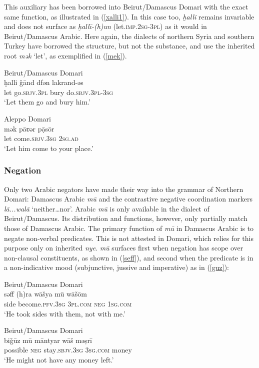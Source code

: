 \documentclass[output=paper]{langsci/langscibook}
\begin{document}
This auxiliary has been borrowed into Beirut/Damascus Domari with the exact same function, as illustrated in (\ref{xalli1}). In this case too, \textit{ḫalli} remains invariable and does not surface as \textit{ḫallī-(h)un} (let.\textsc{imp.2sg-3pl}) as it would in Beirut/Damascus Arabic. Here again, the dialects of northern Syria and southern Turkey have borrowed the structure, but not the substance, and use the inherited root \textit{mək} ‘let’, as exemplified in (\ref{mek}).

\ea \label{xalli1}
{Beirut/Damascus Domari}\\
\gll ḫalli \v{g}ānd dfən lakrand-əs\\
     let go.\textsc{sbjv.3pl} bury do.\textsc{sbjv.3pl-3sg}\\
\glt ‘Let them go and bury him.’
\z

\ea \label{mek}
{Aleppo Domari}\\
\gll mək pāʋər pạ̄sōr\\
     let come.\textsc{sbjv.3sg} \textsc{2sg.ad}\\
\glt ‘Let him come to your place.’
\z


 \subsubsection{Negation}

Only two Arabic negators have made their way into the grammar of Northern Domari: Damascus Arabic \textit{mū} and the contrastive negative coordination markers \textit{lā...walā} ‘neither…nor’. Arabic \textit{mū} is only available in the dialect of Beirut/Damascus. Its distribution and functions, however, only partially match those of Damascus Arabic. The primary function of \textit{mū} in Damascus Arabic is to negate non-verbal predicates. This is not attested in Domari, which relies for this purpose only on inherited \textit{nye}. \textit{mū} surfaces first when negation has scope over non-clausal constituents, as shown in (\ref{seff}), and second when the predicate is in a non-indicative mood (subjunctive, jussive and imperative) as in (\ref{guz}):

\ea
{Beirut/Damascus Domari}\\ \label{seff}
\gll səff (h)ra wāšya mū wāšōm\\
     side become\textsc{.pfv.3sg} \textsc{3pl.com} \textsc{neg} \textsc{1sg.com}\\
\glt ‘He took sides with them, not with me.’
\z

\ea \label{guz}
{Beirut/Damascus Domari}\\
\gll bi\v{g}ūz mū māntyar wāš məṣrī\\
     possible \textsc{neg} stay\textsc{.sbjv.3sg} \textsc{3sg.com} money\\
\glt ‘He might not have any money left.’
\z
\end{document}
